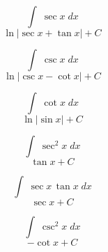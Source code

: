\documentclass[avery5371,grid]{flashcards}
\begin{document}
\begin{flashcard}{\large \vspace*{\fill} \[ \int\; \sec x \;dx \] \vspace*{\fill}   }{\large \vspace*{\fill} \[ \ln|\sec x + \tan x| + C   \] \vspace*{\fill}   }\end{flashcard}

\begin{flashcard}{\large \vspace*{\fill} \[ \int\; \csc x \;dx \] \vspace*{\fill}   }{\large \vspace*{\fill} \[ \ln|\csc x - \cot x| + C   \] \vspace*{\fill}   }\end{flashcard}

\begin{flashcard}{\large \vspace*{\fill} \[ \int\; \cot x \;dx \] \vspace*{\fill}   }{\large \vspace*{\fill} \[ \ln|\sin x| + C   \] \vspace*{\fill}   }\end{flashcard}





\begin{flashcard}{\large \vspace*{\fill} \[ \int\; \sec^2 x \;dx  \] \vspace*{\fill}   }{\large \vspace*{\fill} \[ \tan x + C \] \vspace*{\fill}   }\end{flashcard}

\begin{flashcard}{\large \vspace*{\fill} \[ \int\; \sec x \, \tan x \;dx \] \vspace*{\fill}   }{\large \vspace*{\fill} \[ \sec x + C  \] \vspace*{\fill}   }\end{flashcard}

\begin{flashcard}{\large \vspace*{\fill} \[ \int\; \csc^2 x \;dx \] \vspace*{\fill}   }{\large \vspace*{\fill} \[ -\cot x + C  \] \vspace*{\fill}   }\end{flashcard}
\end{document}
